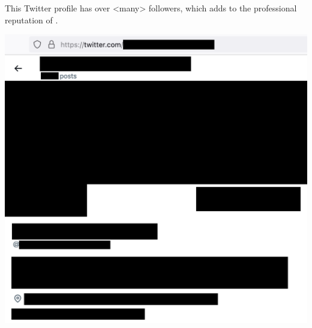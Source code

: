 
This Twitter profile has over <many> followers, which adds to the professional reputation of \MrGdeGoogleInterviewer.

\includegraphics[width=\textwidth]{gde-google-interviewer-twitter_public}

\pagebreak
